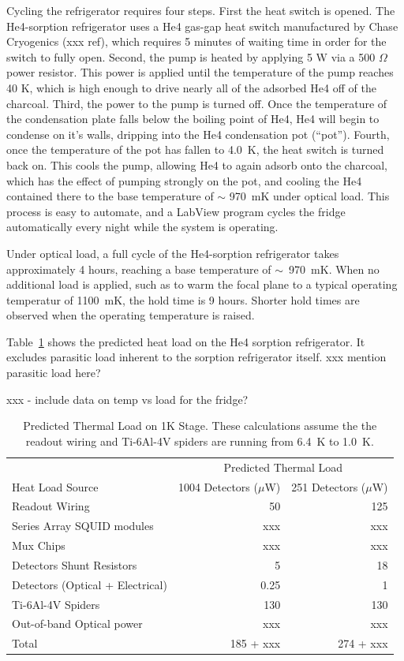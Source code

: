\documentclass[10pt,twocolumn,article]{memoir}
\newcommand{\tableref}[1]{Table~\ref{#1}}
\newcommand{\He}[1]{He#1\xspace}
\newcommand{\uW}{\ensuremath{\mu}W\xspace}
\newcommand{\Ohm}{\ensuremath{\Omega}\xspace}
\begin{document}
Cycling the refrigerator requires four steps.
First the heat switch is opened.
The \He4-sorption refrigerator uses a \He4 gas-gap heat switch manufactured by Chase Cryogenics (xxx ref), which requires 5 minutes of waiting time in order for the switch to fully open.
Second, the pump is heated by applying 5 W via a 500 \Ohm power resistor.
This power is applied until the temperature of the pump reaches 40 K, which is high enough to drive nearly all of the adsorbed \He4 off of the charcoal.
Third, the power to the pump is turned off.
Once the temperature of the condensation plate falls below the boiling point of \He4, \He4 will begin to condense on it's walls, dripping into the \He4 condensation pot (``pot'').
Fourth, once the temperature of the pot has fallen to 4.0~K, the heat switch is turned back on.
This cools the pump, allowing \He4 to again adsorb onto the charcoal, which has the effect of pumping strongly on the pot, and cooling the \He4 contained there to the base temperature of $\sim$ 970~mK under optical load.
This process is easy to automate, and a LabView program cycles the fridge automatically every night while the system is operating.

Under optical load, a full cycle of the \He4-sorption refrigerator takes approximately 4 hours, reaching a base temperature of $\sim$~970~mK.
When no additional load is applied, such as to warm the focal plane to a typical operating temperatur of 1100~mK, the hold time is 9 hours.
Shorter hold times are observed when the operating temperature is raised. %

\tableref{tab:fp-thermal-load} shows the predicted heat load on the \He4 sorption refrigerator.
It excludes parasitic load inherent to the sorption refrigerator itself. xxx mention parasitic load here?

xxx - include data on temp vs load for the fridge?

\begin{table}[ht]
\centering
\caption{Predicted Thermal Load on 1K Stage. These calculations assume the the readout wiring and Ti-6Al-4V spiders are running from 6.4~K to 1.0~K.}
\label{tab:fp-thermal-load}
\begin{tabular}{@{}lrr@{}}
\toprule
 & \multicolumn{2}{c}{Predicted Thermal Load} \\
\cmidrule(r){2-3}
Heat Load Source & 1004 Detectors (\uW) &  251 Detectors (\uW) \\
\midrule
Readout Wiring 								& 50 & 125 \\
Series Array SQUID modules 		& xxx & xxx \\
Mux Chips 									& xxx & xxx \\
Detectors Shunt Resistors 			& 5 & 18 \\
Detectors (Optical + Electrical)		& 0.25 & 1 \\
Ti-6Al-4V Spiders 							& 130 & 130 \\
Out-of-band Optical power 			& xxx & xxx \\
\midrule
Total												& 185 + xxx & 274 + xxx \\
\bottomrule
\end{tabular}
\end{table}
\end{document}
